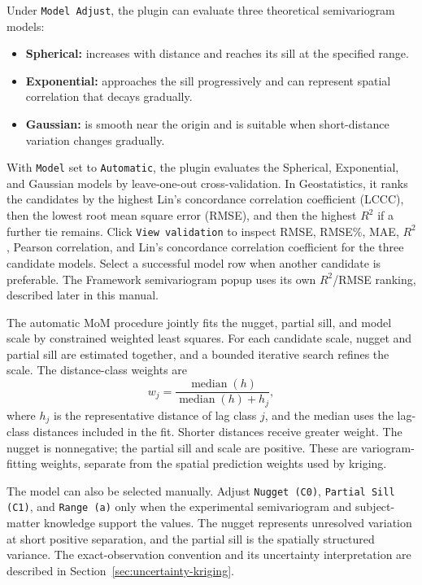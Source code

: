 \documentclass[11pt,a4paper]{article}
\begin{document}
Under \texttt{Model Adjust}, the plugin can evaluate three theoretical semivariogram models:

\begin{itemize}
    \item \textbf{Spherical:} increases with distance and reaches its sill at the specified range.
    \item \textbf{Exponential:} approaches the sill progressively and can represent spatial correlation that decays gradually.
    \item \textbf{Gaussian:} is smooth near the origin and is suitable when short-distance variation changes gradually.
\end{itemize}

With \texttt{Model} set to \texttt{Automatic}, the plugin evaluates the Spherical, Exponential, and Gaussian models by leave-one-out cross-validation. In Geostatistics, it ranks the candidates by the highest Lin's concordance correlation coefficient (LCCC), then the lowest root mean square error (RMSE), and then the highest $R^2$ if a further tie remains. Click \texttt{View validation} to inspect RMSE, RMSE\%, MAE, $R^2$, Pearson correlation, and Lin's concordance correlation coefficient for the three candidate models. Select a successful model row when another candidate is preferable. The Framework semivariogram popup uses its own $R^2$/RMSE ranking, described later in this manual.

The automatic MoM procedure jointly fits the nugget, partial sill, and model scale by constrained weighted least squares. For each candidate scale, nugget and partial sill are estimated together, and a bounded iterative search refines the scale. The distance-class weights are
\[
    w_j=\frac{\operatorname{median}(h)}{\operatorname{median}(h)+h_j},
\]
where $h_j$ is the representative distance of lag class $j$, and the median uses the lag-class distances included in the fit. Shorter distances receive greater weight. The nugget is nonnegative; the partial sill and scale are positive. These are variogram-fitting weights, separate from the spatial prediction weights used by kriging.

The model can also be selected manually. Adjust \texttt{Nugget (C0)}, \texttt{Partial Sill (C1)}, and \texttt{Range (a)} only when the experimental semivariogram and subject-matter knowledge support the values. The nugget represents unresolved variation at short positive separation, and the partial sill is the spatially structured variance. The exact-observation convention and its uncertainty interpretation are described in Section~\ref{sec:uncertainty-kriging}.
\end{document}
